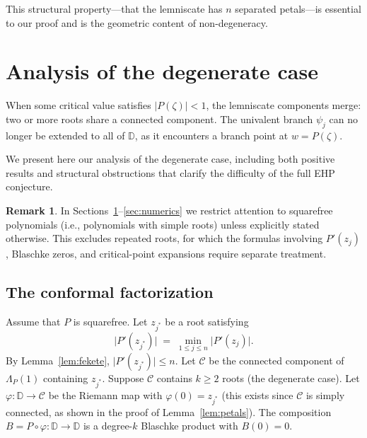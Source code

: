 \documentclass[11pt,a4paper]{amsart}
\theoremstyle{definition}
\newtheorem{remark}[theorem]{Remark}
\newcommand{\D}{\mathbb{D}}
\newcommand{\abs}[1]{\lvert #1 \rvert}
\begin{document}
This structural property---that the lemniscate has $n$ separated petals---is
essential to our proof and is the geometric content of non-degeneracy.

\section{Analysis of the degenerate case}
\label{sec:degenerate}

When some critical value satisfies $\abs{P(\zeta)} < 1$, the lemniscate
components merge: two or more roots share a connected component.
The univalent branch $\psi_j$ can no longer be extended to all of $\D$,
as it encounters a branch point at $w = P(\zeta)$.

We present here our analysis of the degenerate case, including both
positive results and structural obstructions that clarify the difficulty of
the full EHP conjecture.

\begin{remark}\label{rem:squarefree-degenerate}
In Sections~\ref{sec:degenerate}--\ref{sec:numerics} we restrict attention
to squarefree polynomials (i.e., polynomials with simple roots) unless
explicitly stated otherwise.  This excludes repeated roots, for which the
formulas involving $P'(z_j)$, Blaschke zeros, and critical-point expansions
require separate treatment.
\end{remark}

\subsection{The conformal factorization}

Assume that $P$ is squarefree.
Let $z_{j^*}$ be a root satisfying
\[
  \abs{P'(z_{j^*})} \;=\; \min_{1 \leq j \leq n} \abs{P'(z_j)}.
\]
By Lemma~\ref{lem:fekete}, $\abs{P'(z_{j^*})} \leq n$.
Let $\mathcal{C}$ be the connected
component of $\Lambda_P(1)$ containing $z_{j^*}$.
Suppose $\mathcal{C}$ contains $k \geq 2$ roots (the degenerate case).
Let $\varphi \colon \D \to \mathcal{C}$ be the
Riemann map with $\varphi(0) = z_{j^*}$
(this exists since $\mathcal{C}$ is simply connected, as shown in
the proof of Lemma~\ref{lem:petals}).
The composition $B = P \circ \varphi \colon \D \to \D$ is a
degree-$k$ Blaschke product with $B(0) = 0$.
\end{document}
